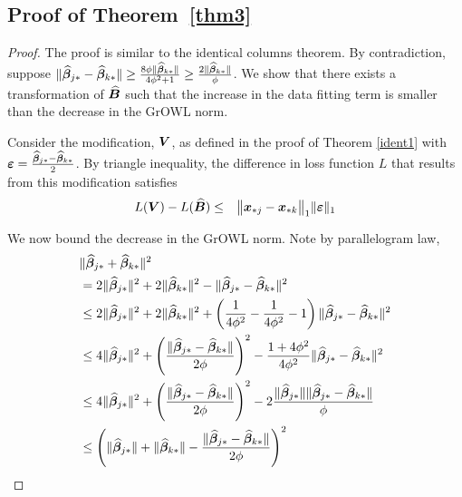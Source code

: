 \subsection*{Proof of Theorem~\ref{thm3}}
\begin{proof}
The proof is similar to the identical columns theorem. By contradiction, suppose
$\|\widehat {\boldsymbol{\beta}}_{j {\ast}} - \widehat {\boldsymbol{\beta}}_{k {\ast}}\| \geq \frac{8\phi \|\widehat {\boldsymbol{\beta}}_{k
    {\ast}}\|}{4\phi^2+1}  \geq \frac{2 \|\widehat {\boldsymbol{\beta}}_{k {\ast}}\|}{\phi}$. We show that there
exists a transformation of $\widehat{\boldsymbol{B}}$ such that the increase in the data fitting term
is smaller than the decrease in the GrOWL norm. 

Consider the modification, $\boldsymbol{V}$, as defined in the proof of Theorem \ref{ident1} with
$\boldsymbol{\varepsilon} = \frac{\widehat {\boldsymbol{\beta}}_{j {\ast}} - \widehat {\boldsymbol{\beta}}_{k {\ast}}}{2}$. By triangle inequality,
the difference in loss function $L$ that results from this modification satisfies
\begin{eqnarray*}
L(\bm V) - L(\widehat{\bm B})  & \leq  & \bigl\|{\bm x}_{{\ast} j}- {\bm x}_{{\ast} k}\bigr\|_1  \|\boldsymbol{\varepsilon} \|_1  
\end{eqnarray*}

We now bound the decrease in the GrOWL norm. Note by parallelogram law, 
\begin{align*}
 & \|\widehat {\boldsymbol{\beta}}_{j {\ast}} + \widehat {\boldsymbol{\beta}}_{k {\ast}}\|^2 \\
 & = 2\|\widehat {\boldsymbol{\beta}}_{j {\ast}}\|^2 + 2\| \widehat {\boldsymbol{\beta}}_{k {\ast}}\|^2 -  \|\widehat {\boldsymbol{\beta}}_{j {\ast}} - \widehat {\boldsymbol{\beta}}_{k {\ast}} \|^2\\
 & \leq 2\|\widehat {\boldsymbol{\beta}}_{j {\ast}}\|^2 + 2\| \widehat {\boldsymbol{\beta}}_{k {\ast}}\|^2 + \left( \frac{1}{4\phi^2} - \frac{1}{4\phi^2} -1 \right) \|\widehat {\boldsymbol{\beta}}_{j {\ast}} - \widehat {\boldsymbol{\beta}}_{k {\ast}} \|^2 \\
 & \leq 4\|\widehat {\boldsymbol{\beta}}_{j {\ast}}\|^2 + \left(  \frac{ \|\widehat {\boldsymbol{\beta}}_{j {\ast}} - \widehat {\boldsymbol{\beta}}_{k {\ast}} \|}{2\phi} \right)^2  - \frac{1 + 4\phi^2}{4\phi^2} \|\widehat {\boldsymbol{\beta}}_{j {\ast}} - \widehat {\boldsymbol{\beta}}_{k {\ast}} \|^2\\
 & \leq 4\|\widehat {\boldsymbol{\beta}}_{j {\ast}}\|^2 + \left(  \frac{ \|\widehat {\boldsymbol{\beta}}_{j {\ast}} - \widehat {\boldsymbol{\beta}}_{k {\ast}} \|}{2\phi} \right)^2 -  2  \frac{ \|\widehat {\boldsymbol{\beta}}_{j {\ast}}\| \|\widehat {\boldsymbol{\beta}}_{j {\ast}} - \widehat {\boldsymbol{\beta}}_{k {\ast}} \|}{\phi} \\
 & \leq \left( \|\widehat {\boldsymbol{\beta}}_{j {\ast}}\| + \| \widehat {\boldsymbol{\beta}}_{k {\ast}}\| -  \frac{ \|\widehat {\boldsymbol{\beta}}_{j {\ast}} - \widehat {\boldsymbol{\beta}}_{k {\ast}} \|}{2\phi} \right)^2
 \end{align*}
 

\end{proof}

